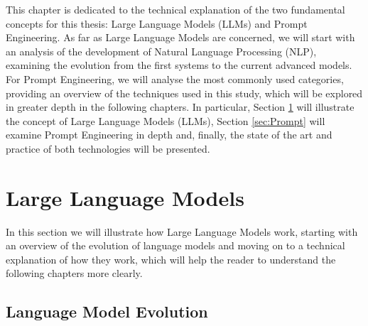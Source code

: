 This chapter is dedicated to the technical explanation of the two fundamental concepts for this thesis: Large Language Models (LLMs) and Prompt Engineering. As far as Large Language Models are concerned, we will start with an analysis of the development of Natural Language Processing (NLP), examining the evolution from the first systems to the current advanced models.
For Prompt Engineering, we will analyse the most commonly used categories, providing an overview of the techniques used in this study, which will be explored in greater depth in the following chapters.
In particular, Section \ref{sec:LLMs} will illustrate the concept of Large Language Models (LLMs), Section \ref{sec:Prompt} will examine Prompt Engineering in depth and, finally, the state of the art and practice of both technologies will be presented.

\section{Large Language Models}
\label{sec:LLMs}
In this section we will illustrate how Large Language Models work, starting with an overview of the evolution of language models and moving on to a technical explanation of how they work, which will help the reader to understand the following chapters more clearly.
\subsection{Language Model Evolution}
\label{sec:Evolution}

